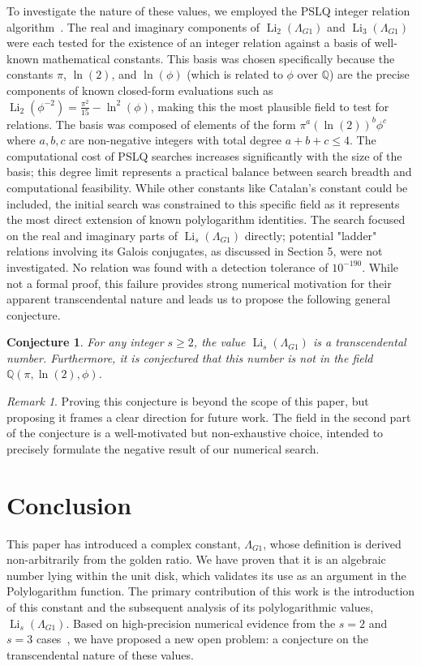 \documentclass{amsart}
\theoremstyle{plain}
\newtheorem{conjecture}[theorem]{Conjecture}
\theoremstyle{definition}
\theoremstyle{remark}
\newtheorem*{remark}{Remark}
\DeclareMathOperator{\Li}{Li}
\newcommand{\LambdaG}{\Lambda_{G1}}
\newcommand{\phiG}{\phi}
\begin{document}
To investigate the nature of these values, we employed the PSLQ integer relation algorithm~\cite{Bailey2007}. The real and imaginary components of $\Li_2(\LambdaG)$ and $\Li_3(\LambdaG)$ were each tested for the existence of an integer relation against a basis of well-known mathematical constants. This basis was chosen specifically because the constants $\pi$, $\ln(2)$, and $\ln(\phiG)$ (which is related to $\phiG$ over $\mathbb{Q}$) are the precise components of known closed-form evaluations such as $\Li_2(\phiG^{-2}) = \frac{\pi^2}{15} - \ln^2(\phiG)$, making this the most plausible field to test for relations. The basis was composed of elements of the form $\pi^a (\ln(2))^b \phiG^c$ where $a,b,c$ are non-negative integers with total degree $a+b+c \le 4$. The computational cost of PSLQ searches increases significantly with the size of the basis; this degree limit represents a practical balance between search breadth and computational feasibility. While other constants like Catalan's constant could be included, the initial search was constrained to this specific field as it represents the most direct extension of known polylogarithm identities. The search focused on the real and imaginary parts of $\Li_s(\LambdaG)$ directly; potential "ladder" relations involving its Galois conjugates, as discussed in Section 5, were not investigated. No relation was found with a detection tolerance of $10^{-190}$. While not a formal proof, this failure provides strong numerical motivation for their apparent transcendental nature and leads us to propose the following general conjecture.

\begin{conjecture}
For any integer $s \ge 2$, the value $\Li_s(\LambdaG)$ is a transcendental number. Furthermore, it is conjectured that this number is not in the field $\mathbb{Q}(\pi, \ln(2), \phiG)$.
\end{conjecture}

\begin{remark}
Proving this conjecture is beyond the scope of this paper, but proposing it frames a clear direction for future work. The field in the second part of the conjecture is a well-motivated but non-exhaustive choice, intended to precisely formulate the negative result of our numerical search.
\end{remark}

\section{Conclusion}
This paper has introduced a complex constant, $\LambdaG$, whose definition is derived non-arbitrarily from the golden ratio. We have proven that it is an algebraic number lying within the unit disk, which validates its use as an argument in the Polylogarithm function. The primary contribution of this work is the introduction of this constant and the subsequent analysis of its polylogarithmic values, $\Li_s(\LambdaG)$. Based on high-precision numerical evidence from the $s=2$ and $s=3$ cases~\cite{mpmath}, we have proposed a new open problem: a conjecture on the transcendental nature of these values.
\end{document}
